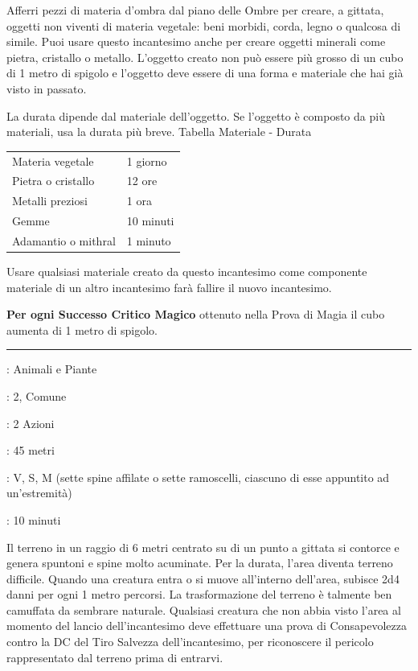\begin{multicols}{2}
Afferri pezzi di materia d'ombra dal piano delle Ombre per creare, a gittata, oggetti non viventi di materia vegetale: beni morbidi, corda, legno o qualcosa di simile. Puoi usare questo incantesimo anche per creare oggetti minerali come pietra, cristallo o metallo. L'oggetto creato non può essere più grosso di un cubo di 1 metro di spigolo e l'oggetto deve essere di una forma e materiale che hai già visto in passato.

La durata dipende dal materiale dell'oggetto. Se l'oggetto è composto da più materiali, usa la durata più breve.
\medskip
Tabella Materiale - Durata
\medskip

\begin{tabularx}{0.45\textwidth}{lX}
	\hline
	Materia vegetale &1 giorno\\
	Pietra o cristallo &12 ore\\
	Metalli preziosi &1 ora\\
	Gemme &10 minuti\\
	Adamantio o mithral &1 minuto
\end{tabularx}
\medskip

Usare qualsiasi materiale creato da questo incantesimo come componente materiale di un altro incantesimo farà fallire il nuovo incantesimo.

\textbf{Per ogni Successo Critico Magico} ottenuto nella Prova di Magia il cubo aumenta di 1 metro di spigolo.

\smallskip\noindent\rule{\linewidth}{2pt} \hypertarget{Crescita di Spuntoni}{}\medskip{}
\noindent
\begin{description}[noitemsep, topsep=0pt, parsep=0pt, partopsep=0pt, leftmargin=0cm, labelwidth=2.8cm]
	\item[\textbf{Lista di Magia}]: Animali e Piante
	\item[\textbf{Livello}]: 2, Comune
	\item[\textbf{T. di Lancio}]: 2 Azioni
	\item[\textbf{Gittata}]: 45 metri
	\item[\textbf{Componenti}]: V, S, M (sette spine affilate o sette ramoscelli, ciascuno di esse appuntito ad un'estremità)
	\item[\textbf{Durata}]: 10 minuti
\end{description}

Il terreno in un raggio di 6 metri centrato su di un punto a gittata si contorce e genera spuntoni e spine molto acuminate. Per la durata, l'area diventa terreno difficile. Quando una creatura entra o si muove all'interno dell'area, subisce 2d4 danni per ogni 1 metro percorsi.
La trasformazione del terreno è talmente ben camuffata da sembrare naturale. Qualsiasi creatura che non abbia visto l'area al momento del lancio dell'incantesimo deve effettuare una prova di Consapevolezza contro la DC del Tiro Salvezza dell'incantesimo, per riconoscere il pericolo rappresentato dal terreno prima di entrarvi.


\end{multicols}
